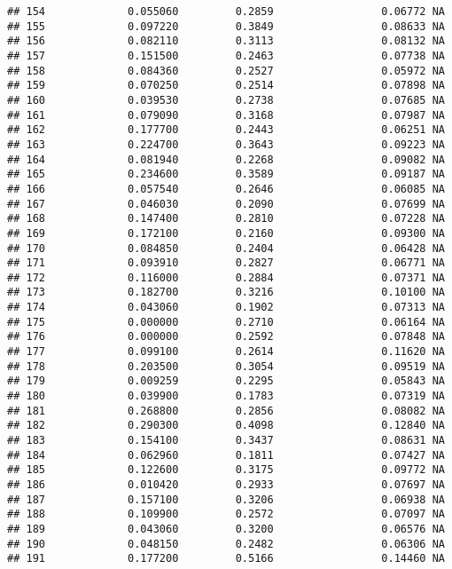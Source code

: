 \documentclass[
]{article}
\begin{document}
\begin{verbatim}
## 154             0.055060         0.2859                 0.06772 NA
## 155             0.097220         0.3849                 0.08633 NA
## 156             0.082110         0.3113                 0.08132 NA
## 157             0.151500         0.2463                 0.07738 NA
## 158             0.084360         0.2527                 0.05972 NA
## 159             0.070250         0.2514                 0.07898 NA
## 160             0.039530         0.2738                 0.07685 NA
## 161             0.079090         0.3168                 0.07987 NA
## 162             0.177700         0.2443                 0.06251 NA
## 163             0.224700         0.3643                 0.09223 NA
## 164             0.081940         0.2268                 0.09082 NA
## 165             0.234600         0.3589                 0.09187 NA
## 166             0.057540         0.2646                 0.06085 NA
## 167             0.046030         0.2090                 0.07699 NA
## 168             0.147400         0.2810                 0.07228 NA
## 169             0.172100         0.2160                 0.09300 NA
## 170             0.084850         0.2404                 0.06428 NA
## 171             0.093910         0.2827                 0.06771 NA
## 172             0.116000         0.2884                 0.07371 NA
## 173             0.182700         0.3216                 0.10100 NA
## 174             0.043060         0.1902                 0.07313 NA
## 175             0.000000         0.2710                 0.06164 NA
## 176             0.000000         0.2592                 0.07848 NA
## 177             0.099100         0.2614                 0.11620 NA
## 178             0.203500         0.3054                 0.09519 NA
## 179             0.009259         0.2295                 0.05843 NA
## 180             0.039900         0.1783                 0.07319 NA
## 181             0.268800         0.2856                 0.08082 NA
## 182             0.290300         0.4098                 0.12840 NA
## 183             0.154100         0.3437                 0.08631 NA
## 184             0.062960         0.1811                 0.07427 NA
## 185             0.122600         0.3175                 0.09772 NA
## 186             0.010420         0.2933                 0.07697 NA
## 187             0.157100         0.3206                 0.06938 NA
## 188             0.109900         0.2572                 0.07097 NA
## 189             0.043060         0.3200                 0.06576 NA
## 190             0.048150         0.2482                 0.06306 NA
## 191             0.177200         0.5166                 0.14460 NA

\end{verbatim}
\end{document}
